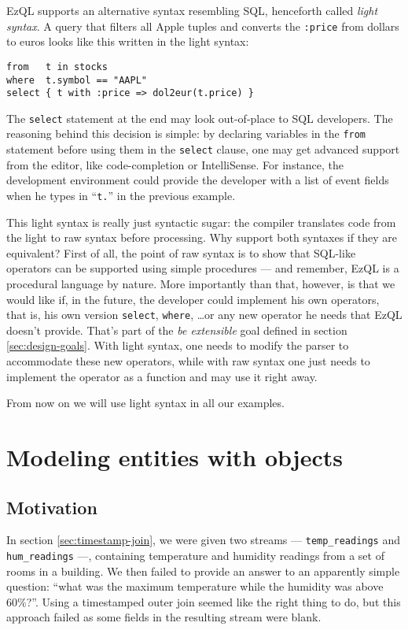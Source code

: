 \documentclass{report}
\begin{document}
EzQL supports an alternative syntax resembling SQL, henceforth called
\emph{light syntax}. A query that filters all Apple tuples and
converts the \verb=:price= from dollars to euros looks like this
written in the light syntax:

\begin{verbatim}
from   t in stocks
where  t.symbol == "AAPL"
select { t with :price => dol2eur(t.price) }
\end{verbatim}

The \verb=select= statement at the end may look out-of-place to SQL
developers. The reasoning behind this decision is simple: by declaring
variables in the \verb=from= statement before using them in the
\verb=select= clause, one may get advanced support from the editor,
like code-completion or IntelliSense. For instance, the development
environment could provide the developer with a list of event fields
when he types in ``\verb=t.='' in the previous example.

This light syntax is really just syntactic sugar: the compiler
translates code from the light to raw syntax before processing. Why
support both syntaxes if they are equivalent? First of all, the point
of raw syntax is to show that SQL-like operators can be supported
using simple procedures --- and remember, EzQL is a procedural
language by nature. More importantly than that, however, is that we
would like if, in the future, the developer could implement his own
operators, that is, his own version \verb=select=, \verb=where=,
\ldots or any new operator he needs that EzQL doesn't provide. That's
part of the \emph{be extensible} goal defined in section
\ref{sec:design-goals}. With light syntax, one needs to modify the
parser to accommodate these new operators, while with raw syntax one
just needs to implement the operator as a function and may use it
right away.

From now on we will use light syntax in all our examples.

\chapter{Modeling entities with objects}
\label{chap:objects}

\section{Motivation}

In section \ref{sec:timestamp-join}, we were given two streams ---
\verb=temp_readings= and \verb=hum_readings= ---, containing temperature
and humidity readings from a set of rooms in a building. We then
failed to provide an answer to an apparently simple question: ``what
was the maximum temperature while the humidity was above
60\%?''. Using a timestamped outer join seemed like the right thing to
do, but this approach failed as some fields in the resulting stream
were blank.
\end{document}

